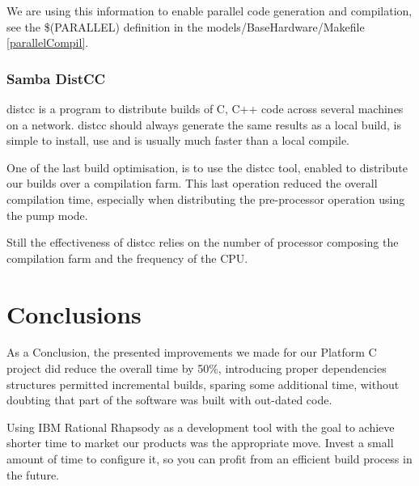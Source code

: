 \documentclass[dvips]{imsart}
\begin{document}
We are using this information to enable parallel code generation and
compilation, see the \$(PARALLEL) definition in the
models/BaseHardware/Makefile \ref{parallelCompil}.

\subsubsection{Samba DistCC}
distcc is a program to distribute builds of C, C++ code across several machines on a network.
distcc should always generate the same results as a local build, is simple to
install, use and is usually much faster than a local
compile\cite{sambaDistcc-09}.

One of the last build optimisation, is to use the distcc tool, enabled to
distribute our builds over a compilation farm. This last operation reduced
the overall compilation time, especially when distributing the pre-processor
operation using the pump mode.

Still the effectiveness of distcc relies on the number of processor composing
the compilation farm and the frequency of the CPU.

\section{Conclusions}
As a Conclusion, the presented improvements we made for our Platform C project
did reduce the overall time by 50\%, introducing proper
dependencies structures permitted incremental builds, sparing some additional
time, without doubting that part of the software was built with out-dated code.

Using IBM Rational Rhapsody as a development tool with the goal to achieve
shorter time to market our products was the appropriate move. Invest a small
amount of time to configure it, so you can profit from an efficient
build process in the future.



\end{document}
